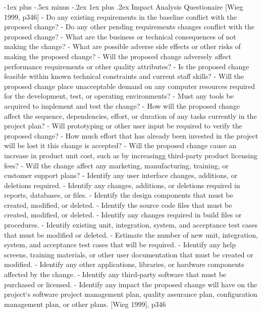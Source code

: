 \documentclass[a4paper]{article}
\makeatletter
\renewcommand{\subsubsection}{\@startsection{subsubsection}{3}{0mm}%
                                {-1ex plus -.5ex minus -.2ex}%
                                {1ex plus .2ex}%
                                {\normalfont\small\bfseries}}
\makeatother
\begin{document}
\begin{multicols}{3}
  \subsubsection{Impact Analysis Questionaire}
  [Wieg 1999, p346]
  - Do any existing requirements in the baseline conflict with the proposed change?
  - Do any other pending requirements changes conflict with the proposed change?
  - What are the business or technical consequences of not making the change?
  - What are possible adverse side effects or other risks of making the proposed change?
  - Will the proposed change adversely affect performance requirements or other quality attributes?
  - Is the proposed change feasible within known technical constraints and current staff skills?
  - Will the proposed change place unacceptable demand on any computer resources required for the development, test, or operating environments?
  - Must any tools be acquired to implement and test the change?
  - How will the proposed change affect the sequence, dependencies, effort, or duration of any tasks currently in the project plan?
  - Will prototyping or other user input be required to verify the proposed change?
  - How much effort that has already been invested in the project will be lost it this change is accepted?
  - Will the proposed change cause an increase in product unit cost, such as by increasingg third-party product licensing fees?
  - Will the change affect any marketing, manufacturing, training, or customer support plans?
  - Identify any user interface changes, additions, or deletions required.
  - Identify any changes, additions, or deletions required in reports, databases, or files.
  - Identify the design components that must be created, modified, or deleted.
  - Identify the source code files that must be created, modified, or deleted.
  - Identify any changes required in build files or procedures.
  - Identify existing unit, integration, system, and acceptance test cases that must be modified or deleted.
  - Estimate the number of new unit, integration, system, and acceptance test cases that will be required.
  - Identify any help screens, training materials, or other user documentation that must be created or modified.
  - Identify any other applications, libraries, or hardware components affected by the change.
  - Identify any third-party software that must be purchased or licensed.
  - Identify any impact the proposed change will have on the project‘s software project management plan, quality assurance plan, configuration management plan, or other plans. [Wieg 1999], p346
  

\end{multicols}
\end{document}
